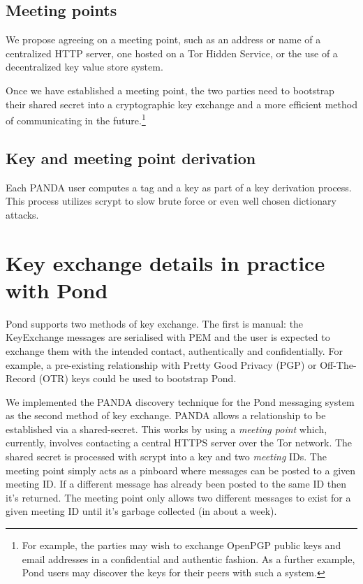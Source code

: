 \documentclass[letterpaper,twocolumn,10pt]{article}
\begin{document}
\subsection{Meeting points}

We propose agreeing on a meeting point, such as an address or name of a
centralized HTTP server, one hosted on a Tor Hidden
Service\cite{Dingledine04tor:the}, or the use of a
decentralized key value store system.

Once we have established a meeting point, the two parties need to bootstrap
their shared secret into a cryptographic key exchange and a more efficient
method of communicating in the future.\footnote{For example, the parties may wish to
exchange OpenPGP public keys and email addresses in a confidential and
authentic fashion. As a further example, Pond users may discover the
keys for their peers with such a system.}

\subsection{Key and meeting point derivation}

Each PANDA user computes a tag and a key as part of a key derivation process.
This process utilizes scrypt\cite{scrypt} to slow brute force or
even well chosen dictionary attacks.

\section{Key exchange details in practice with Pond}

Pond supports two methods of key exchange. The first is manual: the
KeyExchange messages are serialised with PEM and the user is expected to
exchange them with the intended contact, authentically and confidentially. For
example, a pre-existing relationship with Pretty Good Privacy (PGP) or
Off-The-Record (OTR) keys could be used to bootstrap Pond.

We implemented\cite{panda} the PANDA discovery technique for the
Pond\cite{pond} messaging system as the second method of key exchange. PANDA
allows a relationship to be established via a shared-secret. This works by
using a {\it meeting point} which, currently, involves contacting a central
HTTPS server over the Tor\cite{Dingledine04tor:the} network. The shared secret is processed with
scrypt\cite{scrypt} into a key and two {\it meeting} IDs. The meeting point
simply acts as a pinboard where messages can be posted to a given meeting ID.
If a different message has already been posted to the same ID then it's
returned. The meeting point only allows two different messages to exist for a
given meeting ID until it's garbage collected (in about a week).
\end{document}
